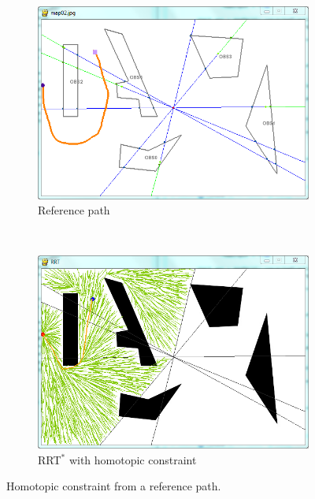 \documentclass[letterpaper, 10 pt, conference]{ieeeconf}
\begin{document}
\begin{figure}
	\centering
	\begin{subfigure}[t]{0.7\linewidth}
		\centering
		\includegraphics[width=\textwidth]{fig/referenceHomotopy.png}
		\caption{Reference path}
		\label{fig:reference_path:reference}
	\end{subfigure}  
	\\
	\begin{subfigure}[t]{0.7\linewidth}
		\centering
		\includegraphics[width=\textwidth]{fig/homotopicConstrainedRRT.png}
		\caption{RRT$^{*}$ with homotopic constraint}
		\label{fig:reference_path:rrt}
	\end{subfigure}   
	\caption{Homotopic constraint from a reference path.}
	\label{fig:reference_path}
\end{figure}
\end{document}
